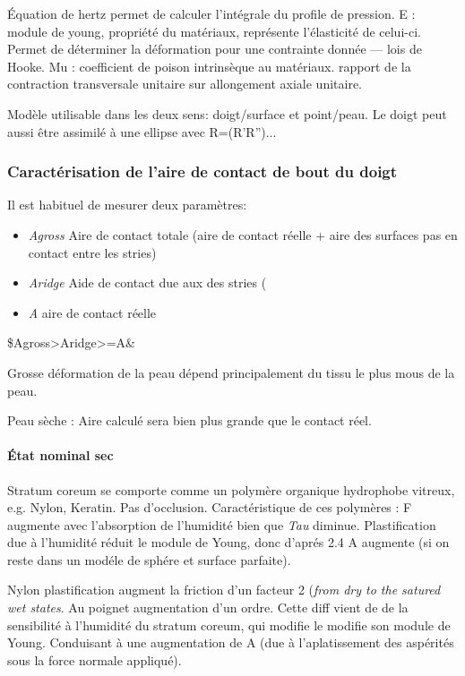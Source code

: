 Équation de hertz permet de calculer l'intégrale du profile de pression. E : module de young, propriété du matériaux, représente l'élasticité de celui-ci. Permet de déterminer la déformation pour une contrainte donnée --- lois de Hooke. Mu : coefficient de poison intrinsèque au matériaux. rapport de la contraction transversale unitaire sur allongement axiale unitaire.

Modèle utilisable dans les deux sens: doigt/surface et point/peau. Le doigt peut aussi être assimilé à une ellipse avec R=(R'R'')...

\subsubsection{Caractérisation de l'aire de contact de bout du doigt}

Il est habituel de mesurer deux paramètres: 
\begin{itemize}
	\item \textit{Agross} Aire de contact totale (aire de contact réelle + aire des surfaces pas en contact entre les stries)
	\item \textit{Aridge} Aide de contact due aux des stries
	(\item \textit {A} aire de contact réelle
\end{itemize}
 \$Agross>Aridge>=A\&
 
 Grosse déformation de la peau dépend principalement du tissu le plus mous de la peau.
 
 Peau sèche : Aire calculé sera bien plus grande que le contact réel.
 
\paragraph{État nominal sec}
 
 Stratum coreum se comporte comme un polymère organique hydrophobe vitreux, e.g. Nylon, Keratin. Pas d'occlusion. 
 Caractéristique de ces polymères : F augmente avec l'absorption de l'humidité bien que \textit{Tau} diminue. Plastification due à l'humidité réduit le module de Young, donc d'aprés 2.4 A augmente (si on reste dans un modéle de sphére et surface parfaite).
 
 Nylon plastification augment la friction d'un facteur 2 (\textit{from dry to the satured wet states}. Au poignet augmentation d'un ordre. Cette diff vient de de la sensibilité à l'humidité du stratum coreum, qui modifie le modifie son module de Young. Conduisant à une augmentation de A (due à l'aplatissement des aspérités sous la force normale appliqué).
 
